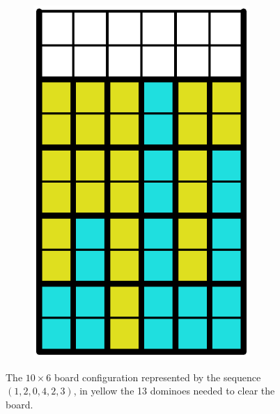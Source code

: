 \begin{figure}[ht]
\begin{subfigure}[b]{0.15\textwidth}
    \includegraphics[width=0.9\textwidth]{pictures/dominoes/vertical_configuration_filled.pdf}
    \caption{}
  \end{subfigure}
    \caption{The $10 \times 6 $ board configuration represented by the sequence $(1,2,0,4,2,3)$, in yellow the 13 dominoes needed to clear the board.}
  \label{dom:vconf}
\end{figure}

